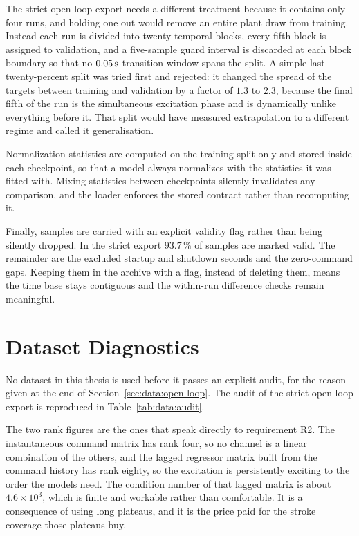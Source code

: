 The strict open-loop export needs a different treatment because it
contains only four runs, and holding one out would remove an entire
plant draw from training. Instead each run is divided into twenty
temporal blocks, every fifth block is assigned to validation, and a
five-sample guard interval is discarded at each block boundary so that
no $\unit[0.05]{s}$ transition window spans the split. A simple
last-twenty-percent split was tried first and rejected: it changed the
spread of the targets between training and validation by a factor of
$1.3$ to $2.3$, because the final fifth of the run is the simultaneous
excitation phase and is dynamically unlike everything before it. That
split would have measured extrapolation to a different regime and called
it generalisation.

Normalization statistics are computed on the training split only and
stored inside each checkpoint, so that a model always normalizes with the
statistics it was fitted with. Mixing statistics between checkpoints
silently invalidates any comparison, and the loader enforces the stored
contract rather than recomputing it.

Finally, samples are carried with an explicit validity flag rather than
being silently dropped. In the strict export $93.7\,\%$ of samples are
marked valid. The remainder are the excluded startup and shutdown
seconds and the zero-command gaps. Keeping them in the archive with a
flag, instead of deleting them, means the time base stays contiguous and
the within-run difference checks remain meaningful.

\section{Dataset Diagnostics}
\label{sec:data:diagnostics}

No dataset in this thesis is used before it passes an explicit audit,
for the reason given at the end of
Section~\ref{sec:data:open-loop}. The audit of the strict open-loop
export is reproduced in Table~\ref{tab:data:audit}.



The two rank figures are the ones that speak directly to requirement R2.
The instantaneous command matrix has rank four, so no channel is a
linear combination of the others, and the lagged regressor matrix built
from the command history has rank eighty, so the excitation is
persistently exciting to the order the models need. The condition number
of that lagged matrix is about $4.6\times10^{3}$, which is finite and
workable rather than comfortable. It is a consequence of using long
plateaus, and it is the price paid for the stroke coverage those
plateaus buy.


